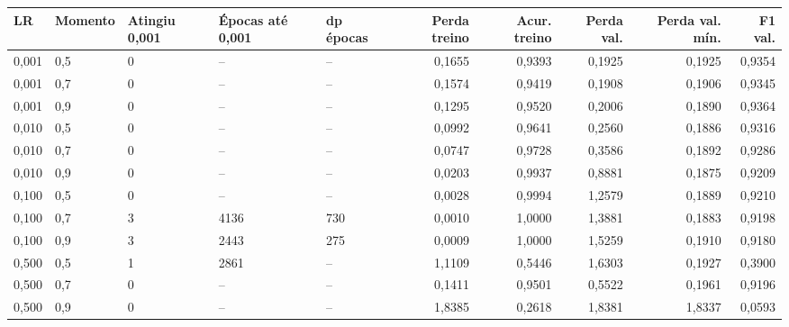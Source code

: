 \begin{tabular}{lllllrrrrr}
\toprule
LR & Momento & Atingiu 0,001 & Épocas até 0,001 & dp épocas & Perda treino & Acur. treino & Perda val. & Perda val. mín. & F1 val. \\
\midrule
0,001 & 0,5 & 0 & -- & -- & 0,1655 & 0,9393 & 0,1925 & 0,1925 & 0,9354 \\
0,001 & 0,7 & 0 & -- & -- & 0,1574 & 0,9419 & 0,1908 & 0,1906 & 0,9345 \\
0,001 & 0,9 & 0 & -- & -- & 0,1295 & 0,9520 & 0,2006 & 0,1890 & 0,9364 \\
0,010 & 0,5 & 0 & -- & -- & 0,0992 & 0,9641 & 0,2560 & 0,1886 & 0,9316 \\
0,010 & 0,7 & 0 & -- & -- & 0,0747 & 0,9728 & 0,3586 & 0,1892 & 0,9286 \\
0,010 & 0,9 & 0 & -- & -- & 0,0203 & 0,9937 & 0,8881 & 0,1875 & 0,9209 \\
0,100 & 0,5 & 0 & -- & -- & 0,0028 & 0,9994 & 1,2579 & 0,1889 & 0,9210 \\
0,100 & 0,7 & 3 & 4136 & 730 & 0,0010 & 1,0000 & 1,3881 & 0,1883 & 0,9198 \\
0,100 & 0,9 & 3 & 2443 & 275 & 0,0009 & 1,0000 & 1,5259 & 0,1910 & 0,9180 \\
0,500 & 0,5 & 1 & 2861 & -- & 1,1109 & 0,5446 & 1,6303 & 0,1927 & 0,3900 \\
0,500 & 0,7 & 0 & -- & -- & 0,1411 & 0,9501 & 0,5522 & 0,1961 & 0,9196 \\
0,500 & 0,9 & 0 & -- & -- & 1,8385 & 0,2618 & 1,8381 & 1,8337 & 0,0593 \\
\bottomrule
\end{tabular}
